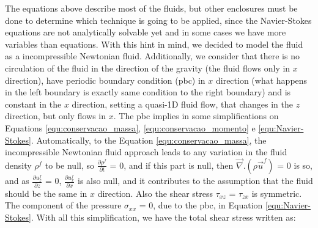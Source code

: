     The equations above describe most of the fluids, but other enclosures must be done to determine which technique is going to be applied, since the Navier-Stokes equations are not analytically solvable yet and in some cases we have more variables than equations. With this hint in mind, we decided to model the fluid as a incompressible Newtonian fluid. Additionally, we consider that there is no circulation of the fluid in the direction of the gravity (the fluid flows only in $x$ direction), have periodic boundary condition (pbc) in $x$ direction (what happens in the left boundary is exactly same condition to the right boundary) and is constant in the $x$ direction, setting a quasi-1D fluid flow, that changes in the $z$ direction, but only flows in $x$. The pbc implies in some simplifications on Equations \ref{equ:conservacao_massa}, \ref{equ:conservacao_momento} e \ref{equ:Navier-Stokes}. Automatically, to the Equation \ref{equ:conservacao_massa}, the incompressible Newtonian fluid approach leads to any variation in the fluid density $\rho^f$ to be null, so $\frac{\partial \rho^f}{\partial t} $ = 0, and if this part is null, then $\vec{\nabla}.(\rho \vec{u}^{f})$ = 0 is so, and as $\frac{\partial u_z^f}{\partial z}$ = 0, $\frac{\partial u_x^f}{\partial x}$ is also null, and it contributes to the assumption that the fluid should be the same in $x$ direction. Also the shear stress $\tau_{xz}$ = $\tau_{zx}$ is symmetric. The component of the pressure $\sigma_{xx}$ = 0, due to the pbc, in Equation \ref{equ:Navier-Stokes}. With all this simplification, we have the total shear stress written as:
